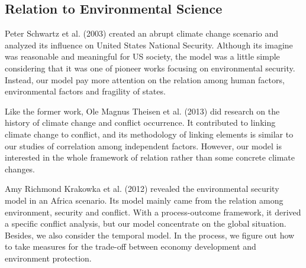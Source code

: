 
\subsection{Relation to Environmental Science}


Peter Schwartz et al. (2003) created an abrupt climate change scenario and analyzed its influence on United States National Security. Although its imagine was reasonable and meaningful for US society, the model was a little simple considering that it was one of pioneer works focusing on environmental security. Instead, our model pay more attention on the relation among human factors, environmental factors and fragility of states.

Like the former work, Ole Magnus Theisen et al. (2013) did research on the history of climate change and conflict occurrence. It contributed to linking climate change to conflict, and its methodology of linking elements is similar to our studies of correlation among independent factors. However, our model is interested in the whole framework of relation rather than some concrete climate changes.

Amy Richmond Krakowka et al. (2012) revealed the environmental security model in an Africa scenario. Its model mainly came from the relation among environment, security and conflict. With a process-outcome framework, it derived a specific conflict analysis, but our model concentrate on the global situation. Besides, we also consider the temporal model. In the process, we figure out how to take measures for the trade-off between economy development and environment protection.
